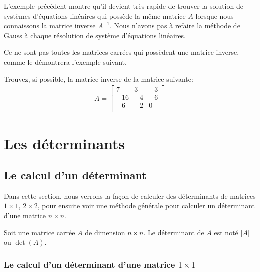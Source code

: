 \documentclass[]{book}
\theoremstyle{definition}
\theoremstyle{definition}
\theoremstyle{definition}
\theoremstyle{remark}
\let\BeginKnitrBlock\begin \let\EndKnitrBlock\end
\begin{document}
L'exemple précédent montre qu'il devient très rapide de trouver la solution de systèmes d'équations linéaires qui possède la même matrice \(A\) lorsque nous connaissons la matrice inverse \(A^{-1}\). Nous n'avons pas à refaire la méthode de Gauss à chaque résolution de système d'équations linéaires.

Ce ne sont pas toutes les matrices carrées qui possèdent une matrice inverse, comme le démontrera l'exemple suivant.

\BeginKnitrBlock{example}
\protect\hypertarget{exm:unnamed-chunk-81}{}{\label{exm:unnamed-chunk-81} }Trouvez, si possible, la matrice inverse de la matrice suivante:
\begin{align*}
A=\begin{bmatrix}
7&3&-3\\
-16&-4&-6\\
-6&-2&0\\
\end{bmatrix}
\end{align*}
\EndKnitrBlock{example}

\hypertarget{determinants}{%
\chapter{Les déterminants}\label{determinants}}

\hypertarget{le-calcul-dun-determinant}{%
\section{Le calcul d'un déterminant}\label{le-calcul-dun-determinant}}

Dans cette section, nous verrons la façon de calculer des déterminants de matrices \(1\times 1\), \(2\times 2\), pour ensuite voir une méthode générale pour calculer un déterminant d'une matrice \(n\times n\).

\BeginKnitrBlock{definition}[Le déterminant d'une matrice]
\protect\hypertarget{def:unnamed-chunk-82}{}{\label{def:unnamed-chunk-82} {} }Soit une matrice carrée \(A\) de dimension \(n\times n\). Le déterminant de \(A\) est noté \(\vert A\vert\) ou \(\det (A)\).
\EndKnitrBlock{definition}

\hypertarget{le-calcul-dun-determinant-dune-matrice-1times-1}{%
\subsection{\texorpdfstring{Le calcul d'un déterminant d'une matrice \(1\times 1\)}{Le calcul d'un déterminant d'une matrice 1\textbackslash times 1}}\label{le-calcul-dun-determinant-dune-matrice-1times-1}}
\end{document}
